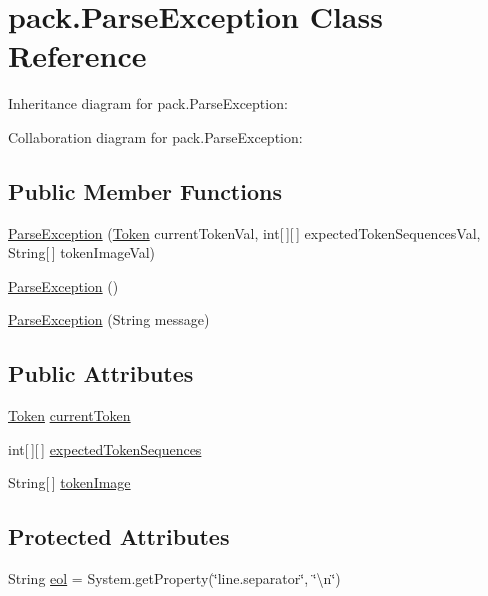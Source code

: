 \hypertarget{classpack_1_1_parse_exception}{}\section{pack.\+Parse\+Exception Class Reference}
\label{classpack_1_1_parse_exception}


Inheritance diagram for pack.\+Parse\+Exception\+:


Collaboration diagram for pack.\+Parse\+Exception\+:
\subsection*{Public Member Functions}
\begin{DoxyCompactItemize}
\item 
\hyperlink{classpack_1_1_parse_exception_a745edb4065dc4046755fb13bf2bde638}{Parse\+Exception} (\hyperlink{classpack_1_1_token}{Token} current\+Token\+Val, int\mbox{[}$\,$\mbox{]}\mbox{[}$\,$\mbox{]} expected\+Token\+Sequences\+Val, String\mbox{[}$\,$\mbox{]} token\+Image\+Val)
\item 
\hyperlink{classpack_1_1_parse_exception_ab3a6309229ffee8827ba5d4e366cb4ad}{Parse\+Exception} ()
\item 
\hyperlink{classpack_1_1_parse_exception_a33b74f43d592261e1420397e31c69665}{Parse\+Exception} (String message)
\end{DoxyCompactItemize}
\subsection*{Public Attributes}
\begin{DoxyCompactItemize}
\item 
\hyperlink{classpack_1_1_token}{Token} \hyperlink{classpack_1_1_parse_exception_af771ffcbd65f981e21a98ba06aed11a6}{current\+Token}
\item 
int\mbox{[}$\,$\mbox{]}\mbox{[}$\,$\mbox{]} \hyperlink{classpack_1_1_parse_exception_aded466561b7bf1e713e6acc68ba9a04d}{expected\+Token\+Sequences}
\item 
String\mbox{[}$\,$\mbox{]} \hyperlink{classpack_1_1_parse_exception_a7897eecab28c89c7da8d0c1ce195782c}{token\+Image}
\end{DoxyCompactItemize}
\subsection*{Protected Attributes}
\begin{DoxyCompactItemize}
\item 
String \hyperlink{classpack_1_1_parse_exception_a1a4505eb551f8364ad29f84ea805fe7b}{eol} = System.\+get\+Property(\char`\"{}line.\+separator\char`\"{}, \char`\"{}\textbackslash{}n\char`\"{})
\end{DoxyCompactItemize}



